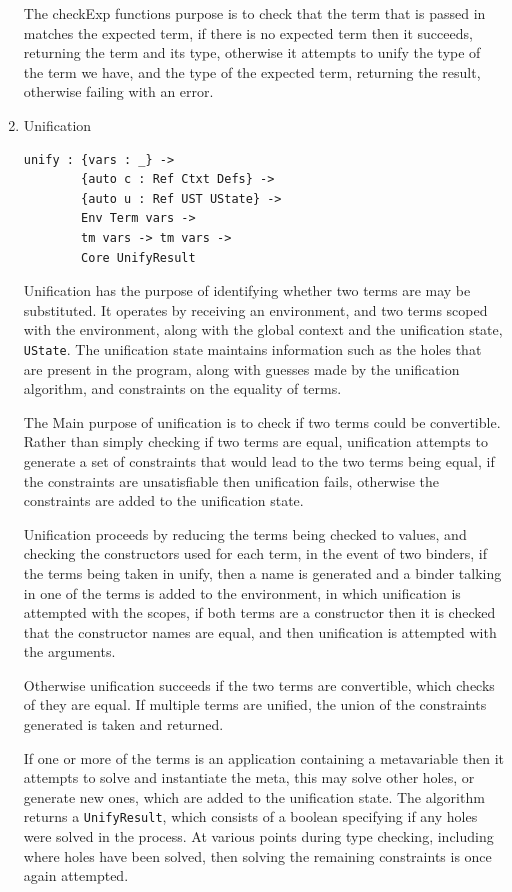 \documentclass[a4paper]{article}
\begin{document}
\begin{enumerate}
The checkExp functions purpose is to check that the term that is passed
in matches the expected term, if there is no expected term then it 
succeeds, returning the term and its type, otherwise it attempts to 
unify the type of the term we have, and the type of the expected term, 
returning the result, otherwise failing with an error. 

\item Unification
\label{sec:org292bf4c}

\begin{center}
\begin{verbatim}
unify : {vars : _} ->
		{auto c : Ref Ctxt Defs} ->
		{auto u : Ref UST UState} ->
		Env Term vars ->
		tm vars -> tm vars ->
		Core UnifyResult
\end{verbatim}
\end{center}
Unification has the purpose of identifying whether two terms are may be substituted. 
It operates by receiving an environment, and two terms scoped 
with the environment, along with the global context and the unification
state, \texttt{UState}. The unification state maintains information such as 
the holes that are present in the program, along with guesses made by 
the unification algorithm, and constraints on the equality of terms.

The Main purpose of unification is to check if two terms could be 
convertible. Rather than simply checking if two terms are equal, 
unification attempts to generate a set of constraints that would lead 
to the two terms being equal, if the constraints are unsatisfiable then
unification fails, otherwise the constraints are added to the
unification state. 

Unification proceeds by reducing the terms being checked to values, and
checking the constructors used for each term, in the event of two binders, 
if the terms being taken in unify, then a name is generated and a 
binder talking in one of the terms is added to the environment, in which
unification is attempted with the scopes, if both terms are a constructor
then it is checked that the constructor names are equal, and then unification
is attempted with the arguments. 

Otherwise unification succeeds if the two terms are convertible, which
checks of they are equal. If multiple terms are unified, the union of the
constraints generated is taken and returned.  

If one or more of the terms is an application containing a metavariable
then it attempts to solve and instantiate the meta, this may solve other 
holes, or generate new ones, which are added to the unification state. 
The algorithm returns a \texttt{UnifyResult}, which consists of a boolean 
specifying if any holes were solved in the process. At various points 
during type checking, including where holes have been solved, then 
solving the remaining constraints is once again attempted. 


\end{enumerate}
\end{document}
